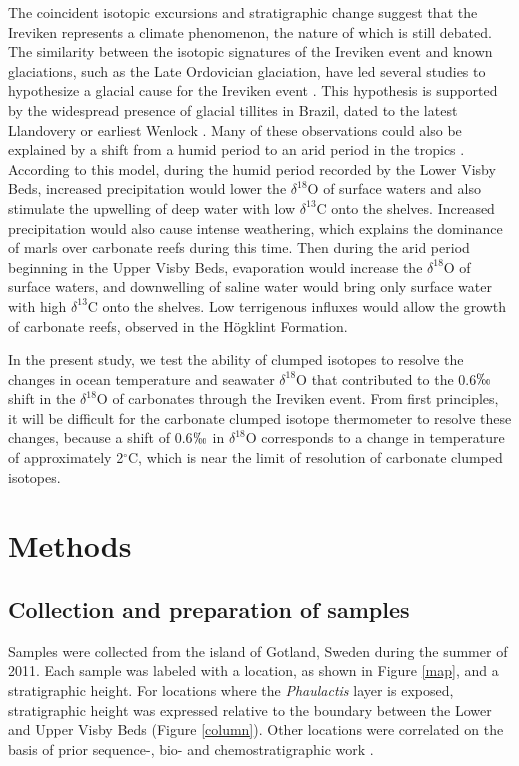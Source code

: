 \documentclass{article}
\newcommand{\deltao}{$\delta^{18}$}
\newcommand{\deltac}{$\delta^{13}$}
\newcommand{\degrees}{$^{\circ}$}
\begin{document}
The coincident isotopic excursions and stratigraphic change suggest that the Ireviken represents a climate phenomenon, the nature of which is still debated. The similarity between the isotopic signatures of the Ireviken event and known glaciations, such as the Late Ordovician glaciation, have led several studies to hypothesize a glacial cause for the Ireviken event \citep{Azmy1998,Kaljo2003,Brand2006,Calner2008}. This hypothesis is supported by the widespread presence of glacial tillites in Brazil, dated to the latest Llandovery or earliest Wenlock \citep{Grahn1992}. Many of these observations could also be explained by a shift from a humid period to an arid period in the tropics \citep{Bickert1997,Munnecke2003,Samtleben1996}. According to this model, during the humid period recorded by the Lower Visby Beds, increased precipitation would lower the \deltao O of surface waters and also stimulate the upwelling of deep water with low \deltac C onto the shelves. Increased precipitation would also cause intense weathering, which explains the dominance of marls over carbonate reefs during this time. Then during the arid period beginning in the Upper Visby Beds, evaporation would increase the \deltao O of surface waters, and downwelling of saline water would bring only surface water with high \deltac C onto the shelves. Low terrigenous influxes would allow the growth of carbonate reefs, observed in the H\"{o}gklint Formation.

In the present study, we test the ability of clumped isotopes to resolve the changes in ocean temperature and seawater \deltao O that contributed to the 0.6$\permil$ shift in the \deltao O of carbonates through the Ireviken event. From first principles, it will be difficult for the carbonate clumped isotope thermometer to resolve these changes, because a shift of 0.6$\permil$ in \deltao O corresponds to a change in temperature of approximately 2\degrees C, which is near the limit of resolution of carbonate clumped isotopes. 

\section{Methods}

\subsection{Collection and preparation of samples}

Samples were collected from the island of Gotland, Sweden during the summer of 2011. Each sample was labeled with a location, as shown in Figure \ref{map}, and a stratigraphic height. For locations where the \textit{Phaulactis} layer is exposed, stratigraphic height was expressed relative to the boundary between the Lower and Upper Visby Beds (Figure \ref{column}). Other locations were correlated on the basis of prior sequence-, bio- and chemostratigraphic work \citep{Calner2004a}.
\end{document}

